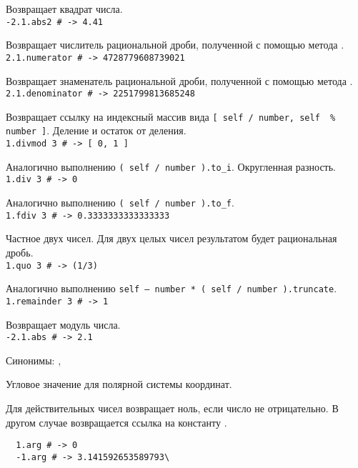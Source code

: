 \begin{methodlist}
  Возвращает квадрат числа.
  \\\verb!-2.1.abs2 # -> 4.41!

  Возвращает числитель рациональной дроби, полученной с помощью метода .
  \\\verb!2.1.numerator # -> 4728779608739021!

  Возвращает знаменатель рациональной дроби, полученной с помощью метода .
  \\\verb!2.1.denominator # -> 2251799813685248!

  Возвращает ссылку на индексный массив вида \verb![ self / number, self  % number ]!. Деление и остаток от деления.
  \\\verb!1.divmod 3 # -> [ 0, 1 ]!

  Аналогично выполнению \verb!( self / number ).to_i!. Округленная разность.
  \\\verb!1.div 3 # -> 0!

  Аналогично выполнению \verb!( self / number ).to_f!.
  \\\verb!1.fdiv 3 # -> 0.3333333333333333!

  Частное двух чисел. Для двух целых чисел результатом будет рациональная дробь.
  \\\verb!1.quo 3 # -> (1/3)!

  Аналогично выполнению \verb!self – number * ( self / number ).truncate!.
  \\\verb!1.remainder 3 # -> 1!

  Возвращает модуль числа.
  \\\verb!-2.1.abs # -> 2.1!

  Синонимы: , 

  Угловое значение для полярной системы координат.

  Для действительных чисел возвращает ноль, если число не отрицательно. В другом случае возвращается ссылка на константу .
  \begin{verbatim}
  1.arg # -> 0
  -1.arg # -> 3.141592653589793\
  \end{verbatim}


\end{methodlist}
